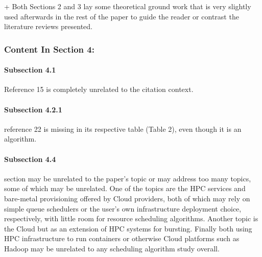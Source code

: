 + Both Sections 2 and 3 lay some theoretical ground work that is very slightly used afterwards in the rest of the paper to guide the reader or contrast the literature reviews presented.




\subsubsection{Content In Section 4:}

\paragraph{Subsection 4.1}

Reference 15 is completely unrelated to the citation context.


\paragraph{Subsection 4.2.1}

reference 22 is missing in its respective table (Table 2), even though it is an algorithm.


\paragraph{Subsection 4.4}

section may be unrelated to the paper's topic or may address too many topics, some of which may be unrelated. One of the topics are the HPC services and bare-metal provisioning offered by Cloud providers, both of which may rely on simple queue schedulers or the user's own infrastructure deployment choice, respectively, with little room for resource scheduling algorithms. Another topic is the Cloud but as an extension of HPC systems for bursting. Finally both using HPC infrastructure to run containers or otherwise Cloud platforms such as Hadoop may be unrelated to any scheduling algorithm study overall.

